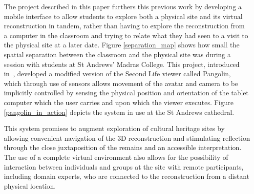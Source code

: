 


The project described in this paper furthers this previous work by developing a mobile interface to allow students to explore both a physical site and its virtual reconstruction in tandem, rather than having to explore the reconstruction from a computer in the classroom and trying to relate what they had seen to a visit to the physical site at a later date. Figure \ref{separation_map} shows how small the spatial separation between the classroom and the physical site was during a session with students at St Andrews' Madras College. This project, introduced in~\cite{Davies2012}, developed a modified version of the Second Life viewer called Pangolin, which through use of sensors allows movement of the avatar and camera to be implicitly controlled by sensing the physical position and orientation of the tablet computer which the user carries and upon which the viewer executes. Figure \ref{pangolin_in_action} depicts the system in use at the St Andrews cathedral.



This system promises to augment exploration of cultural heritage sites by allowing convenient navigation of the 3D reconstruction and stimulating reflection through the close juxtaposition of the remains and an accessible interpretation. The use of a complete virtual environment also allows for the possibility of interaction between individuals and groups at the site with remote participants, including domain experts, who are connected to the reconstruction from a distant physical location.

